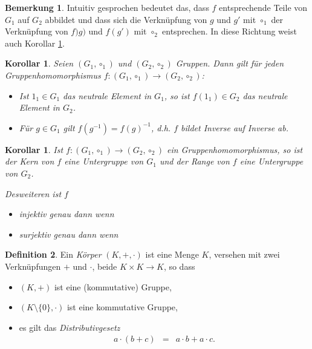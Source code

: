 \documentclass[index=totoc]{scrartcl}%
\newtheorem{cor}[thm]{Korollar}
\theoremstyle{definition}
\newtheorem{defi}{Definition}[section]
\newtheorem{bem}[defi]{Bemerkung}
\begin{document}
\begin{bem}
  Intuitiv gesprochen bedeutet das,
  dass $f$ entsprechende Teile von $G_1$ auf $G_2$ abbildet
  und dass sich die Verknüpfung von $g$ und $g'$ mit $\circ_1$
  der  Verknüpfung von $f)g)$ und $f(g')$ mit $\circ_2$ entsprechen.
  In diese Richtung weist auch Korollar \ref{cor:homNeuInv}. 
\end{bem}


\begin{cor}\label{cor:homNeuInv}
  Seien $(G_1,\circ_1)$ und $(G_2,\circ_2)$ Gruppen.
  Dann gilt für jeden Gruppenhomomorphismus
  $f\colon(G_1,\circ_1)\to(G_2,\circ_2)$:
  \begin{itemize}
  \item
    Ist $1_1\in G_1$ das neutrale Element in $G_1$,
    so ist $f(1_1)\in G_2$ das neutrale Element in $G_2$.
  \item
    Für $g\in G_1$ gilt $f(g^{-1})=f(g)^{-1}$,
    d.h. $f$ bildet Inverse auf Inverse ab. 
  \end{itemize}
\end{cor}

\begin{cor}
  Ist  $f\colon(G_1,\circ_1)\to(G_2,\circ_2)$ ein Gruppenhomomorphismus,
  so ist der Kern von $f$ eine Untergruppe von $G_1$
  und der Range von $f$ eine Untergruppe von $G_2$.

  Desweiteren ist $f$
  \begin{itemize}
  \item 
    injektiv genau dann wenn 
  \item
    surjektiv genau dann wenn 
  \end{itemize}

\end{cor}




\begin{defi}
  Ein {\em Körper} $(K, +, \cdot)$ ist eine Menge $K$,
  versehen mit zwei Verknüpfungen $+$ und $\cdot$, beide $K\times K\to K$,
  so dass
  \begin{itemize}
  \item
    $(K,+)$ ist eine (kommutative) Gruppe, 
  \item
    $(K\setminus\{0\},\cdot)$ ist eine kommutative Gruppe,
  \item
    es gilt das {\em Distributivgesetz}
    \begin{eqnarray*}
      a\cdot(b+c) &=& a\cdot b+a\cdot c. 
    \end{eqnarray*}
  \end{itemize}
\end{defi}
\end{document}
